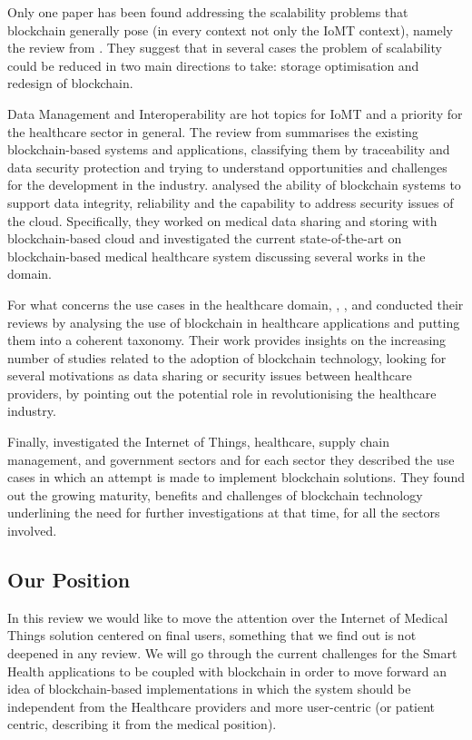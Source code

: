 \documentclass[preprint]{elsarticle}
\begin{document}
Only one paper has been found addressing the scalability problems that blockchain generally pose (in every context not only the IoMT context), namely the review from \citet{mazlan2020scalability}. They suggest that in several cases the problem of scalability could be reduced in two main directions to take: storage optimisation and redesign of blockchain.

Data Management and Interoperability are hot topics for IoMT and a priority for the healthcare sector in general. The review from \citet{zhang2019review} summarises the existing blockchain-based systems and applications, classifying them by traceability and data security protection and trying to understand opportunities and challenges for the development in the industry. 
\citet{saha2019review} analysed the ability of blockchain systems to support data integrity, reliability and the capability to address security issues of the cloud. Specifically, they worked on medical data sharing and storing with blockchain-based cloud and investigated the current state-of-the-art on blockchain-based medical healthcare system discussing several works in the domain.

For what concerns the use cases in the healthcare domain, \citet{hussien2019systematic}, \citet{holbl2018systematic}, \citet{zubaydi2019review} and \citet{khezr2019blockchain} conducted their reviews by analysing the use of blockchain in healthcare applications and putting them into a coherent taxonomy. Their work provides insights on the increasing number of studies related to the adoption of blockchain technology, looking for several motivations as data sharing or security issues between healthcare providers, by pointing out the potential role in revolutionising the healthcare industry.

Finally, \citet{al2018blockchain} investigated the Internet of Things, healthcare, supply chain management, and government sectors and for each sector they described the use cases in which an attempt is made to implement blockchain solutions. They found out the growing maturity, benefits and challenges of blockchain technology underlining the need for further investigations at that time, for all the sectors involved.

\subsection{Our Position} 
In this review we would like to move the attention over the Internet of Medical Things solution centered on final users, something that we find out is not deepened in any review. We will go through the current challenges for the Smart Health applications to be coupled with blockchain in order to move forward an idea of blockchain-based implementations in which the system should be independent from the Healthcare providers and more user-centric (or patient centric, describing it from the medical position).
\end{document}
